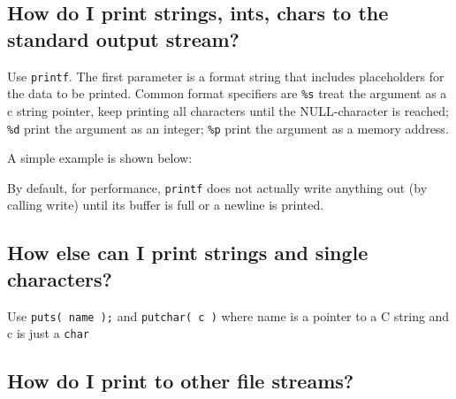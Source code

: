 \subsection{How do I print strings, ints, chars to the standard output
stream?}\label{how-do-i-print-strings-ints-chars-to-the-standard-output-stream}

Use \texttt{printf}. The first parameter is a format string that
includes placeholders for the data to be printed. Common format
specifiers are \texttt{\%s} treat the argument as a c string pointer,
keep printing all characters until the NULL-character is reached;
\texttt{\%d} print the argument as an integer; \texttt{\%p} print the
argument as a memory address.

A simple example is shown below:

\begin{Shaded}
\end{Shaded}

By default, for performance, \texttt{printf} does not actually write
anything out (by calling write) until its buffer is full or a newline is
printed.

\subsection{How else can I print strings and single
characters?}\label{how-else-can-i-print-strings-and-single-characters}

Use \texttt{puts(\ name\ );} and \texttt{putchar(\ c\ )} where name is a
pointer to a C string and c is just a \texttt{char}

\subsection{How do I print to other file
streams?}\label{how-do-i-print-to-other-file-streams}

